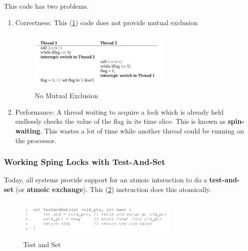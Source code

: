 This code has two problems.\\

\begin{enumerate}
    \item Correctness: This (\ref{282}) code does not provide mutual exclusion
        \begin{figure}[h!]
            \label{282}
            \begin{center}
                \includegraphics[width=7cm, height=3cm]{img/282.png}
                \caption{No Mutual Exclusion}
            \end{center}
        \end{figure}
    
    \item Performance: A thread waiting to acquire a lock which is already held
        endlessly checks the value of the flag in its time slice. This is known
        as \textbf{spin-waiting}. This wastes a lot of time while another thread
        could be running on the processor.
\end{enumerate}

\subsubsection{Working Sping Locks with Test-And-Set}

Today, all systems provide support for an atmoic intsruction to do a
\textbf{test-and-set} (or \textbf{atmoic exchange}). This (\ref{testandset})
instruction does this atomically.

\begin{figure}[h!]
    \label{testandset}
    \begin{center}
        \includegraphics[width=8cm, height=2cm]{img/testandset.png}
        \caption{Test and Set}
    \end{center}
\end{figure}

